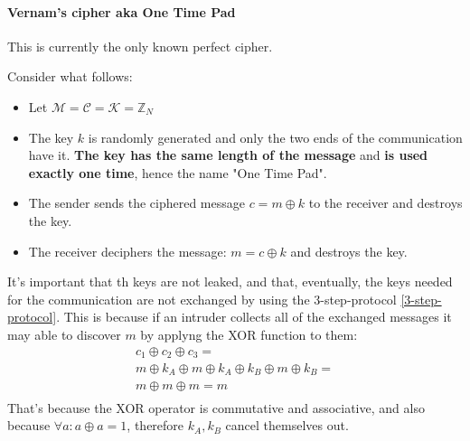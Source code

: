 \paragraph{Vernam's cipher aka One Time Pad}
This is currently the only known perfect cipher. \newline
\begin{definition}
    Consider what follows:
    \begin{itemize}
        \item Let $\mathcal{M} = \mathcal{C} = \mathcal{K} = \mathbb{Z}_{N}$
        \item The key $k$ is randomly generated and only the two ends of the communication have it. \textbf{The key has the same length of the message} and \textbf{is used exactly one time}, hence the name "One Time Pad".
        \item The sender sends the ciphered message $c = m \oplus k$ to the receiver and destroys the key.
        \item The receiver deciphers the message: $m = c \oplus k$ and destroys the key.
    \end{itemize}
\end{definition}
It's important that th keys are not leaked, and that, eventually, the keys needed for the communication are not exchanged by using the 3-step-protocol \ref{3-step-protocol}. This is because if an intruder collects all of the exchanged messages it may able to discover $m$ by applyng the XOR function to them:
\begin{gather*}
    c_{1} \oplus c_{2} \oplus c_{3} =\\
    m \oplus k_{A} \oplus m \oplus k_{A} \oplus k_{B} \oplus m \oplus k_{B} =\\
    m \oplus m \oplus m = m \\
\end{gather*}
That's because the XOR operator is commutative and associative, and also because $\forall a: a \oplus a = 1$, therefore $k_{A}, k_{B}$ cancel themselves out.
